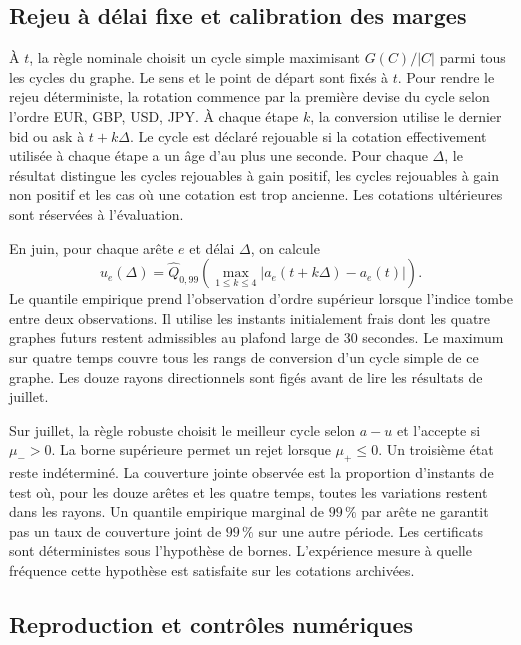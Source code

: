 \documentclass[11pt,a4paper]{article}
\theoremstyle{clair}
\begin{document}
\clearpage
\subsection{Rejeu à délai fixe et calibration des marges}

À $t$, la règle nominale choisit un cycle simple maximisant $G(C)/|C|$ parmi tous les cycles du graphe. Le sens et le point de départ sont fixés à $t$. Pour rendre le rejeu déterministe, la rotation commence par la première devise du cycle selon l'ordre EUR, GBP, USD, JPY. À chaque étape $k$, la conversion utilise le dernier bid ou ask à $t+k\Delta$. Le cycle est déclaré rejouable si la cotation effectivement utilisée à chaque étape a un âge d'au plus une seconde. Pour chaque $\Delta$, le résultat distingue les cycles rejouables à gain positif, les cycles rejouables à gain non positif et les cas où une cotation est trop ancienne. Les cotations ultérieures sont réservées à l'évaluation.

En juin, pour chaque arête $e$ et délai $\Delta$, on calcule
\begin{equation}
 u_e(\Delta)
 =\widehat Q_{0{,}99}\!\left(
    \max_{1\le k\le4}\left|a_e(t+k\Delta)-a_e(t)\right|
   \right).
 \label{eq:calibration}
\end{equation}
Le quantile empirique prend l'observation d'ordre supérieur lorsque l'indice tombe entre deux observations. Il utilise les instants initialement frais dont les quatre graphes futurs restent admissibles au plafond large de 30 secondes. Le maximum sur quatre temps couvre tous les rangs de conversion d'un cycle simple de ce graphe. Les douze rayons directionnels sont figés avant de lire les résultats de juillet.

Sur juillet, la règle robuste choisit le meilleur cycle selon $a-u$ et l'accepte si $\mu_->0$. La borne supérieure permet un rejet lorsque $\mu_+\le0$. Un troisième état reste indéterminé. La couverture jointe observée est la proportion d'instants de test où, pour les douze arêtes et les quatre temps, toutes les variations restent dans les rayons. Un quantile empirique marginal de $99\,\%$ par arête ne garantit pas un taux de couverture joint de $99\,\%$ sur une autre période. Les certificats sont déterministes sous l'hypothèse de bornes. L'expérience mesure à quelle fréquence cette hypothèse est satisfaite sur les cotations archivées.

\subsection{Reproduction et contrôles numériques}
\end{document}
